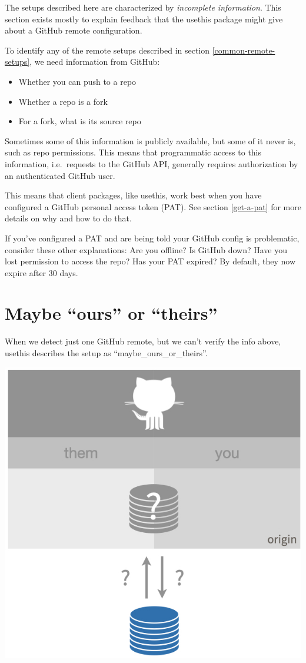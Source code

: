 \documentclass[
]{book}
\providecommand{\tightlist}{%
  \setlength{\itemsep}{0pt}\setlength{\parskip}{0pt}}
\begin{document}
The setups described here are characterized by \emph{incomplete information}.
This section exists mostly to explain feedback that the usethis package might give about a GitHub remote configuration.

To identify any of the remote setups described in section \ref{common-remote-setups}, we need information from GitHub:

\begin{itemize}
\tightlist
\item
  Whether you can push to a repo
\item
  Whether a repo is a fork
\item
  For a fork, what is its source repo
\end{itemize}

Sometimes some of this information is publicly available, but some of it never is, such as repo permissions.
This means that programmatic access to this information, i.e.~requests to the GitHub API, generally requires authorization by an authenticated GitHub user.

This means that client packages, like usethis, work best when you have configured a GitHub personal access token (PAT).
See section \ref{get-a-pat} for more details on why and how to do that.

If you've configured a PAT and are being told your GitHub config is problematic, consider these other explanations:
Are you offline?
Is GitHub down?
Have you lost permission to access the repo?
Has your PAT expired?
By default, they now expire after 30 days.

\section{Maybe ``ours'' or ``theirs''}\label{maybe-ours-or-theirs}

When we detect just one GitHub remote, but we can't verify the info above, usethis describes the setup as ``maybe\_ours\_or\_theirs''.

\begin{center}\includegraphics[width=0.6\linewidth]{img/maybe_ours_or_theirs} \end{center}
\end{document}
